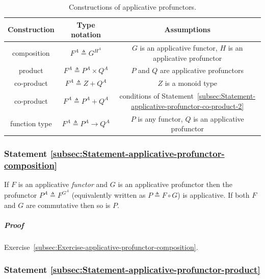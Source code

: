 \begin{table}
\begin{centering}
\begin{tabular}{|c|c|c|}
\hline 
\textbf{\small{}Construction} & \textbf{\small{}Type notation} & \textbf{\small{}Assumptions}\tabularnewline
\hline 
\hline 
{\footnotesize{}composition} & {\footnotesize{}$F^{A}\triangleq G^{H^{A}}$} & {\footnotesize{}$G$ is an applicative functor, $H$ is an applicative
profunctor}\tabularnewline
\hline 
{\footnotesize{}product} & {\footnotesize{}$F^{A}\triangleq P^{A}\times Q^{A}$} & {\footnotesize{}$P$ and $Q$ are applicative profunctors}\tabularnewline
\hline 
{\footnotesize{}co-product} & {\footnotesize{}$F^{A}\triangleq Z+Q^{A}$} & {\footnotesize{}$Z$ is a monoid type}\tabularnewline
\hline 
{\footnotesize{}co-product} & {\footnotesize{}$F^{A}\triangleq P^{A}+Q^{A}$} & {\footnotesize{}conditions of Statement~\ref{subsec:Statement-applicative-profunctor-co-product-2}}\tabularnewline
\hline 
{\footnotesize{}function type} & {\footnotesize{}$F^{A}\triangleq P^{A}\rightarrow Q^{A}$} & {\footnotesize{}$P$ is any functor, $Q$ is an applicative profunctor}\tabularnewline
\hline 
\end{tabular}
\par\end{centering}
\caption{Constructions of applicative profunctors.\label{tab:Constructions-of-applicative-profunctors}}
\end{table}


\subsubsection{Statement \label{subsec:Statement-applicative-profunctor-composition}\ref{subsec:Statement-applicative-profunctor-composition}}

If $F$ is an applicative \emph{functor} and $G$ is an applicative
profunctor then the profunctor $P^{A}\triangleq F^{G^{A}}$ (equivalently
written as $P\triangleq F\circ G$) is applicative. If both $F$ and
$G$ are commutative then so is $P$.

\subparagraph{Proof}

Exercise~\ref{subsec:Exercise-applicative-profunctor-composition}.

\subsubsection{Statement \label{subsec:Statement-applicative-profunctor-product}\ref{subsec:Statement-applicative-profunctor-product}}

